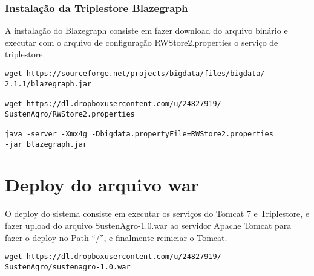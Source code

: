 \subsubsection*{Instalação da Triplestore Blazegraph}

A instalação do Blazegraph consiste em fazer download do arquivo binário
e executar com o arquivo de configuração RWStore2.properties o serviço
de triplestore.

\begin{lstlisting}
wget https://sourceforge.net/projects/bigdata/files/bigdata/
2.1.1/blazegraph.jar

wget https://dl.dropboxusercontent.com/u/24827919/
SustenAgro/RWStore2.properties

java -server -Xmx4g -Dbigdata.propertyFile=RWStore2.properties 
-jar blazegraph.jar
\end{lstlisting}

\section{Deploy do arquivo war}

O deploy do sistema consiste em executar os serviços do Tomcat 7 e
Triplestore, e fazer upload do arquivo SustenAgro-1.0.war ao servidor
Apache Tomcat para fazer o deploy no Path ``/'', e finalmente reiniciar
o Tomcat.

\begin{lstlisting}
wget https://dl.dropboxusercontent.com/u/24827919/
SustenAgro/sustenagro-1.0.war
\end{lstlisting}
